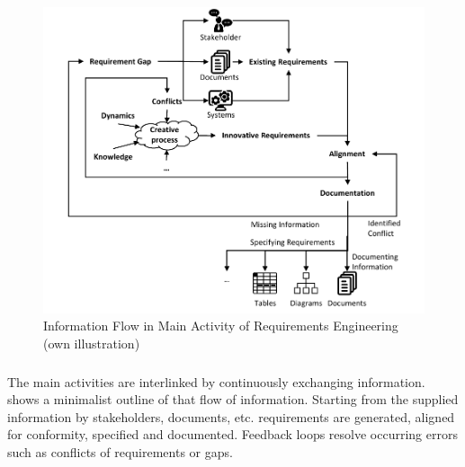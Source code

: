 \label{endFacet}
\begin{figure}[H]
    \centering
    \includegraphics[scale=1]{img/MainActivity.pdf}
    \caption[Information Flow in Main Activity of Requirements Engineering]{Information Flow in Main Activity of Requirements Engineering (own illustration)}
    \label{fig:infFlow}
\end{figure}
\subparagraph{}\label{beginmain} The main activities are interlinked by continuously exchanging information.  shows a minimalist outline of that flow of information. Starting from the supplied information by stakeholders, documents, etc. requirements are generated, aligned for conformity, specified and documented. Feedback loops resolve occurring errors such as conflicts of requirements or gaps.
